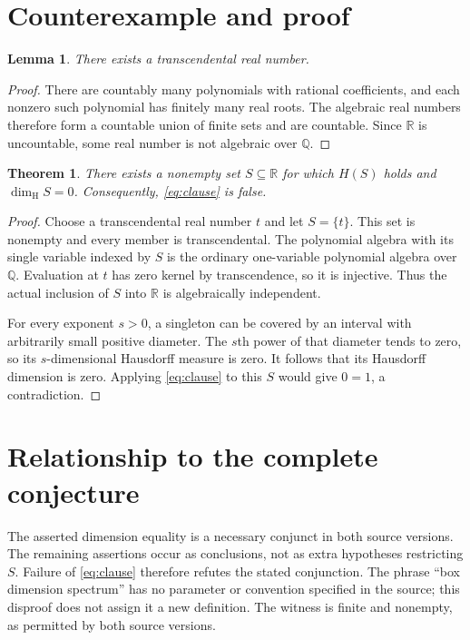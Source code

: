 \documentclass[11pt]{article}
\newtheorem{theorem}{Theorem}
\newtheorem{lemma}{Lemma}
\newcommand{\Q}{\mathbb{Q}}
\newcommand{\R}{\mathbb{R}}
\newcommand{\dimH}{\dim_{\mathrm H}}
\begin{document}
\section{Counterexample and proof}
\begin{lemma}
There exists a transcendental real number.
\end{lemma}
\begin{proof}
There are countably many polynomials with rational coefficients, and each
nonzero such polynomial has finitely many real roots. The algebraic real numbers
therefore form a countable union of finite sets and are countable. Since $\R$ is
uncountable, some real number is not algebraic over $\Q$.
\end{proof}

\begin{theorem}\label{thm:counterexample}
There exists a nonempty set $S\subseteq\R$ for which $H(S)$ holds and
$\dimH S=0$. Consequently, \eqref{eq:clause} is false.
\end{theorem}
\begin{proof}
Choose a transcendental real number $t$ and let $S=\{t\}$. This set is nonempty
and every member is transcendental. The polynomial algebra with its single
variable indexed by $S$ is the ordinary one-variable polynomial algebra over
$\Q$. Evaluation at $t$ has zero kernel by transcendence, so it is injective.
Thus the actual inclusion of $S$ into $\R$ is algebraically independent.

For every exponent $s>0$, a singleton can be covered by an interval with
arbitrarily small positive diameter. The $s$th power of that diameter tends to
zero, so its $s$-dimensional Hausdorff measure is zero. It follows that its
Hausdorff dimension is zero. Applying \eqref{eq:clause} to this $S$ would give
$0=1$, a contradiction.
\end{proof}

\section{Relationship to the complete conjecture}
The asserted dimension equality is a necessary conjunct in both source versions.
The remaining assertions occur as conclusions, not as extra hypotheses restricting
$S$. Failure of \eqref{eq:clause} therefore refutes the stated conjunction.
The phrase ``box dimension spectrum'' has no parameter or convention specified
in the source; this disproof does not assign it a new definition.
The witness is finite and nonempty, as permitted by both source versions.
\end{document}
